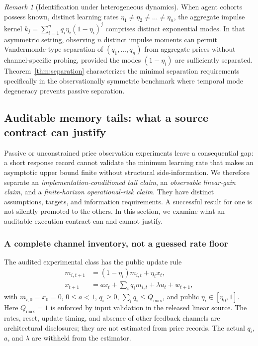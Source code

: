 \documentclass[10pt,twocolumn,letterpaper]{article}
\theoremstyle{definition}
\theoremstyle{remark}
\newtheorem{remark}[theorem]{Remark}
\begin{document}
\begin{remark}[Identification under heterogeneous dynamics]
When agent cohorts possess known, distinct learning rates $\eta_1 \neq \eta_2 \neq \dots \neq \eta_n$, the aggregate impulse kernel $k_j = \sum_{i=1}^n q_i \eta_i (1 - \eta_i)^j$ comprises distinct exponential modes. In that asymmetric setting, observing $n$ distinct impulse moments can permit Vandermonde-type separation of $(q_1, \dots, q_n)$ from aggregate prices without channel-specific probing, provided the modes $(1 - \eta_i)$ are sufficiently separated. Theorem~\ref{thm:separation} characterizes the minimal separation requirements specifically in the observationally symmetric benchmark where temporal mode degeneracy prevents passive separation.
\end{remark}

\subsection{Auditable memory tails: what a source contract can justify}
\label{sec:audited_tails}
Passive or unconstrained price observation experiments leave a consequential gap: a short response record cannot validate the minimum learning rate that makes an asymptotic upper bound finite without structural side-information. We therefore separate an \emph{implementation-conditioned tail claim}, an \emph{observable linear-gain claim}, and a \emph{finite-horizon operational-risk claim}. They have distinct assumptions, targets, and information requirements. A successful result for one is not silently promoted to the others. In this section, we examine what an auditable execution contract can and cannot justify.

\subsubsection{A complete channel inventory, not a guessed rate floor}
The audited experimental class has the public update rule
\begin{align}
 m_{i,t+1} &= (1-\eta_i)m_{i,t}+\eta_i x_t, \nonumber\\
 x_{t+1} &= a x_t+\sum_i q_i m_{i,t}+\lambda u_t+w_{t+1},
 \label{eq:audited_recursion}
\end{align}
with $m_{i,0}=x_0=0$, $0\le a<1$, $q_i\ge0$, $\sum_iq_i\le Q_{\max}$, and public $\eta_i\in[\eta_0,1]$. Here $Q_{\max}=1$ is enforced by input validation in the released linear source. The rates, reset, update timing, and absence of other feedback channels are architectural disclosures; they are not estimated from price records. The actual $q_i$, $a$, and $\lambda$ are withheld from the estimator.
\end{document}
